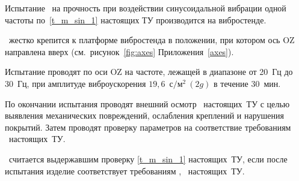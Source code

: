 Испытание \dut \  на прочность при воздействии синусоидальной вибрации одной частоты по~\ref{t_m_sin_1} настоящих ТУ производится на вибростенде.

\dut \ жестко крепится к платформе вибростенда в положении, при котором ось OZ направлена вверх (см.~рисунок~\ref{fig:axes} Приложения~\ref{axes}).

Испытание проводят по оси OZ на частоте, лежащей в диапазоне от 20~Гц до 30~Гц, при амплитуде виброускорения $19,6$~$\text{с}/\text{м}^2~(2g)$ в течение $30$~мин.

По окончании испытания проводят внешний осмотр \trebafter \ настоящих~ТУ с целью выявления механических повреждений, ослабления креплений и нарушения покрытий. Затем проводят проверку параметров на соответствие требованиям \treb \ настоящих~ТУ.

\dut \ считается выдержавшим проверку \ref{t_m_sin_1} настоящих~ТУ, если после испытания изделие соответствует требованиям \treb, \trebafter \ настоящих~ТУ.
